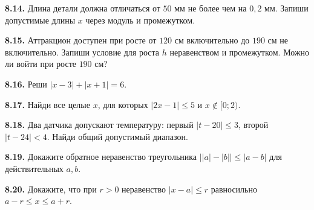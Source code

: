 \noindent\begin{minipage}[t]{\linewidth}\textbf{8.14.} Длина детали должна отличаться от \(50\) мм не более чем на \(0{,}2\) мм. Запиши допустимые длины \(x\) через модуль и промежутком.\par\end{minipage}\par
\noindent\begin{minipage}[t]{\linewidth}\textbf{8.15.} Аттракцион доступен при росте от \(120\) см включительно до \(190\) см не включительно. Запиши условие для роста \(h\) неравенством и промежутком. Можно ли войти при росте \(190\) см?\par\end{minipage}\par
\noindent\begin{minipage}[t]{\linewidth}\textbf{8.16.}\starmark{} Реши \(| x - 3 | + | x + 1 | = 6\).\par\end{minipage}\par
\noindent\begin{minipage}[t]{\linewidth}\textbf{8.17.}\starmark{} Найди все целые \(x\), для которых \(| 2 x - 1 | \le  5\) и \(x \notin  [0;\allowbreak 2)\).\par\end{minipage}\par
\noindent\begin{minipage}[t]{\linewidth}\textbf{8.18.}\starmark{} Два датчика допускают температуру: первый \(| t - 20 | \le  3\), второй \(| t - 24 | < 4\). Найди общий допустимый диапазон.\par\end{minipage}\par
\noindent\begin{minipage}[t]{\linewidth}\textbf{8.19.} Докажите обратное неравенство треугольника \(\bigl||a|-|b|\bigr|\leq|a-b|\) для действительных \(a,b\).\par\end{minipage}\par
\noindent\begin{minipage}[t]{\linewidth}\textbf{8.20.} Докажите, что при \(r>0\) неравенство \(|x-a|\leq r\) равносильно \(a-r\leq x\leq a+r\).\par\end{minipage}\par
\endgroup
